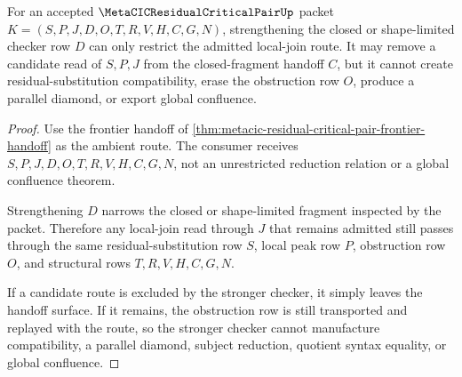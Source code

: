 \begin{theorem}
\label{thm:metacic-residual-critical-pair-closed-checker-monotonicity}
For an accepted $\MetaCICResidualCriticalPairUp$ packet $K=(S,P,J,D,O,T,R,V,H,C,G,N)$, strengthening the closed or shape-limited checker row $D$ can only restrict the admitted local-join route. It may remove a candidate read of $S,P,J$ from the closed-fragment handoff $C$, but it cannot create residual-substitution compatibility, erase the obstruction row $O$, produce a parallel diamond, or export global confluence.
\end{theorem}
\begin{proof}
Use the frontier handoff of \autoref{thm:metacic-residual-critical-pair-frontier-handoff} as the ambient route. The consumer receives $S,P,J,D,O,T,R,V,H,C,G,N$, not an unrestricted reduction relation or a global confluence theorem.

Strengthening $D$ narrows the closed or shape-limited fragment inspected by the packet. Therefore any local-join read through $J$ that remains admitted still passes through the same residual-substitution row $S$, local peak row $P$, obstruction row $O$, and structural rows $T,R,V,H,C,G,N$.

If a candidate route is excluded by the stronger checker, it simply leaves the handoff surface. If it remains, the obstruction row is still transported and replayed with the route, so the stronger checker cannot manufacture compatibility, a parallel diamond, subject reduction, quotient syntax equality, or global confluence.
\end{proof}



